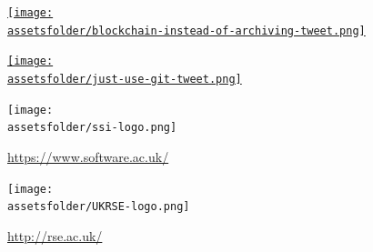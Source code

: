 \documentclass{beamer}
\newcommand{\assetsfolder}{./assets}
\begin{document}
    \begin{frame}
        \begin{center}
            \href{https://twitter.com/JamesCampbell95/status/996419422951825410}{\texttt{[image: \\assetsfolder/blockchain-instead-of-archiving-tweet.png]}}
        \end{center}
    \end{frame}

    \begin{frame}
        \begin{center}
            \href{https://twitter.com/legogradstudent/status/979776951517876225}{\texttt{[image: \\assetsfolder/just-use-git-tweet.png]}}
        \end{center}
    \end{frame}

	\begin{frame}
		\begin{center}
		\end{center}
	\end{frame}

	\begin{frame}
	   \begin{center}
		   \texttt{[image: \\assetsfolder/ssi-logo.png]}

			\url{https://www.software.ac.uk/}
	   \end{center}
	\end{frame}

	\begin{frame}
	   \begin{center}
		   \texttt{[image: \\assetsfolder/UKRSE-logo.png]}

			\url{http://rse.ac.uk/}
	   \end{center}
	\end{frame}
\end{document}
